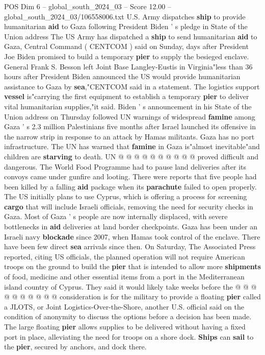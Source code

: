 \begin{textsample}{POS Dim 6 – global\_south\_2024\_03 – Score 12.00 – global\_south\_2024\_03/106558006.txt}  \label{ex:f6_pos_035}
U.S.
Army dispatches \textbf{ship} to provide humanitarian \textbf{aid} to Gaza following President Biden ' s pledge in State of the Union address The US Army has dispatched a \textbf{ship} to send humanitarian \textbf{aid} to Gaza, Central Command ( CENTCOM ) said on Sunday, days after President Joe Biden promised to build a temporary \textbf{pier} to supply the besieged enclave.
General Frank S.
Besson left Joint Base Langley-Eustis in Virginia"less than 36 hours after President Biden announced the US would provide humanitarian assistance to Gaza by \textbf{sea},"CENTCOM said in a statement.
The logistics support \textbf{vessel} is"carrying the first equipment to establish a temporary \textbf{pier} to deliver vital humanitarian supplies,"it said.
Biden ' s announcement in his State of the Union address on Thursday followed UN warnings of widespread \textbf{famine} among Gaza ' s 2.3 million Palestinians five months after Israel launched its offensive in the narrow strip in response to an attack by Hamas militants.
Gaza has no port infrastructure.
The UN has warned that \textbf{famine} in Gaza is"almost inevitable"and children are \textbf{starving} to death.
UN @ @ @ @ @ @ @ @ @ @ proved difficult and dangerous.
The World Food Programme had to pause land deliveries after its convoys came under gunfire and looting.
There were reports that five people had been killed by a falling \textbf{aid} package when its \textbf{parachute} failed to open properly.
The US initially plans to use Cyprus, which is offering a process for screening \textbf{cargo} that will include Israeli officials, removing the need for security checks in Gaza.
Most of Gaza ' s people are now internally displaced, with severe bottlenecks in \textbf{aid} deliveries at land border checkpoints.
Gaza has been under an Israeli navy \textbf{blockade} since 2007, when Hamas took control of the enclave.
There have been few direct \textbf{sea} arrivals since then.
On Saturday, The Associated Press reported, citing US officials, the planned operation will not require American troops on the ground to build the \textbf{pier} that is intended to allow more \textbf{shipments} of food, medicine and other essential items from a port in the Mediterranean island country of Cyprus.
They said it would likely take weeks before the @ @ @ @ @ @ @ @ @ @ consideration is for the military to provide a floating \textbf{pier} called a JLOTS, or Joint Logistics-Over-the-Shore, another U.S. official said on the condition of anonymity to discuss the options before a decision has been made.
The large floating \textbf{pier} allows supplies to be delivered without having a fixed port in place, alleviating the need for troops on a shore dock. \textbf{Ships} can \textbf{sail} to the \textbf{pier}, secured by anchors, and dock there.

\end{textsample}
